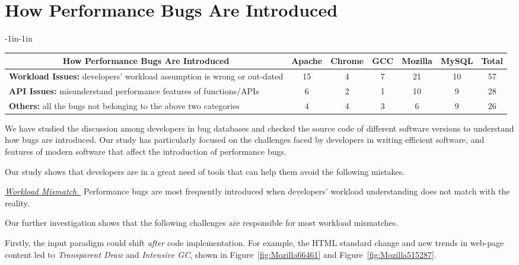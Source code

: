 \section{How Performance Bugs Are Introduced}
\label{sec:3_introduce}

\begin{table*}[tb!]
\begin{adjustwidth}{-1in}{-1in}
\scriptsize
\centering
{
\begin{tabular}{lcccccc}
\toprule
\multicolumn{1}{c}{\bf How Performance Bugs Are Introduced} &Apache&Chrome&GCC&Mozilla&MySQL&Total\\
\midrule
\multicolumn{1}{l}{{\bf Workload Issues:} {developers' workload assumption is wrong or out-dated}}
&15&4&7&21&10&57\\
\midrule
\multicolumn{1}{l}{{\bf API Issues:} {misunderstand performance features of functions/APIs}}
&6&2&1&10&9&28\\
\midrule
\multicolumn{1}{l}{{\bf Others:} all the bugs not belonging to the above two categories}
&4&4&3&6&9&26\\
\bottomrule

\end{tabular}
}
\end{adjustwidth}
\caption{How performance bugs are introduced in Sections~\ref{sec:3_introduce}}
\label{tab:3_intro}
\end{table*}

We have studied the discussion among developers in bug databases and checked the 
source code of different software versions to understand how bugs are introduced. 
Our study has particularly focused on the challenges faced by developers in writing 
efficient software, and features of modern software that affect the introduction
of performance bugs. 

Our study shows that developers are in a great need of tools that can help them 
avoid the following mistakes.

\underline{\it Workload Mismatch\ }
Performance bugs are most frequently introduced when 
developers' workload understanding does not match with the reality.

Our further investigation shows that the following challenges
are responsible for most workload mismatches.

Firstly, the input paradigm could shift {\it after}
code implementation. For example, the HTML standard change and new trends in 
web-page content led to {\it Transparent Draw} and
{\it Intensive GC}, shown
in Figure~\ref{fig:Mozilla66461} and Figure~\ref{fig:Mozilla515287}.

